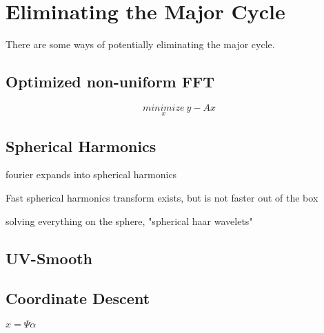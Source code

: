 \section{Eliminating the Major Cycle}\label{killmajor}

There are some ways of potentially eliminating the major cycle. 


\subsection{Optimized non-uniform FFT}

\begin{equation}
\underset{x}{minimize} \: y - Ax
\end{equation}

\subsection{Spherical Harmonics}
fourier expands into spherical harmonics

Fast spherical harmonics transform exists, but is not faster out of the box

solving everything on the sphere, "spherical haar wavelets"

\subsection{UV-Smooth}

\subsection{Coordinate Descent}
$x = \Psi\alpha$
